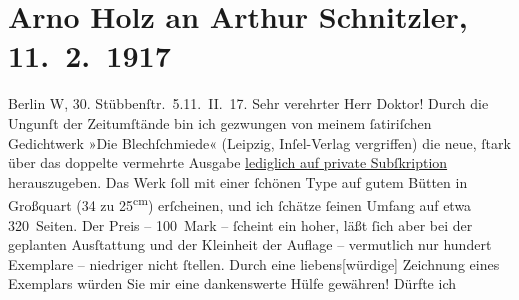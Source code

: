 

         
         \renewcommand{\erwaehntePersonen}{Personen: Arno Holz}
         \renewcommand{\erwaehnteInstitutionen}{Institutionen: Insel-Verlag, Petzschke {\kaufmannsund}  Gretschel}
         \renewcommand{\erwaehnteOrte}{Orte: Berlin, Dresden, Leipzig, Stübbenstraße, Wien}
         \renewcommand{\erwaehnteWerke}{Werke: Die Blechschmiede}
               \section[Arno Holz an Arthur Schnitzler, 11. 2. 1917]{ Arno Holz an Arthur Schnitzler, 11. 2. 1917}\nopagebreak{}\rehead{ }\begin{ledgroupsized}[t]{13cm}\normalsize\beginnumbering{} \toendnotes[C]{\smallbreak\pagebreak[2]} 
\pstart
           \raggedleft{}{\pb}Berlin W, 30. Stübbenſtr. 5.\hspace*{1.5em}11. II. 17. \pend
           \pstart\center{}Sehr verehrter Herr Doktor!\pend\pstart
           Durch die Ungunſt der Zeitumſtände bin ich gezwungen von meinem ſatiriſchen
               Gedichtwerk »Die Blechſchmiede« (Leipzig, Inſel-Verlag vergriffen) die neue, ſtark über das doppelte vermehrte Ausgabe
                  \uline{lediglich auf private Subſkription} herauszugeben.
               Das Werk ſoll mit einer ſchönen Type auf gutem Bütten in Großquart (34 zu 25\textsuperscript{cm}) erſcheinen, und ich ſchätze ſeinen Umfang auf etwa
               320 Seiten. Der Preis – 100 Mark – ſcheint ein hoher, läßt ſich aber bei der
               geplanten Ausſtattung und der Kleinheit der Auflage – vermutlich nur hundert
               Exemplare – niedriger nicht ſtellen. Durch eine liebens{[}würdige{]}
               Zeichnung eines Exemplars würden Sie mir eine dankenswerte Hülfe gewähren! Dürfte ich

\end{ledgroupsized}
